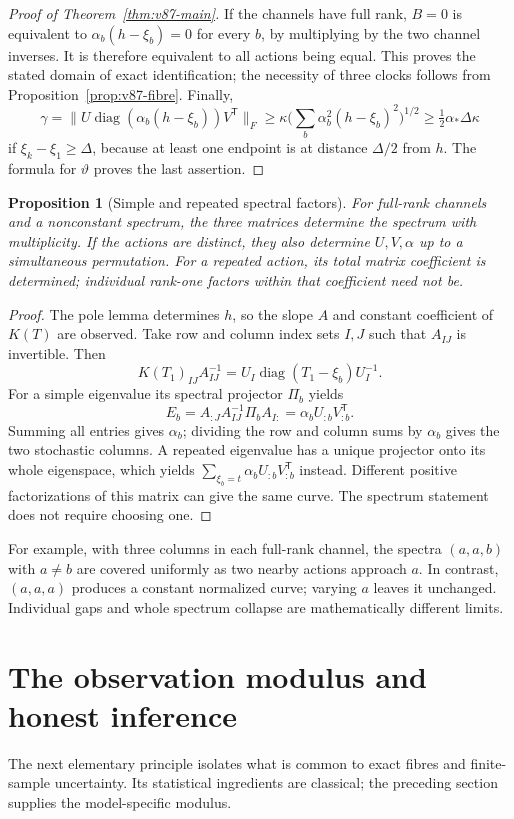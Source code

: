 \documentclass[11pt,reqno]{amsart}
\numberwithin{equation}{section}
\newtheorem{proposition}[theorem]{Proposition}
\theoremstyle{definition}\newtheorem{definition}[theorem]{Definition}
\theoremstyle{remark}\newtheorem{remark}[theorem]{Remark}
\newcommand{\diag}{\operatorname{diag}}
\newcommand{\sig}{\vartheta}
\begin{document}
\begin{proof}[Proof of Theorem~\ref{thm:v87-main}]
If the channels have full rank, $B=0$ is equivalent to
$\alpha_b(h-\xi_b)=0$ for every $b$, by multiplying by the two
channel inverses. It is therefore equivalent to all actions being
equal. This proves the stated domain of exact identification; the
necessity of three clocks follows from Proposition~\ref{prop:v87-fibre}.
Finally,
\[
 \gamma=\|U\diag(\alpha_b(h-\xi_b))V^{\mathsf T}\|_F
 \ge\kappa\Big(\sum_b\alpha_b^2(h-\xi_b)^2\Big)^{1/2}
 \ge\tfrac12\alpha_*\Delta\kappa
\]
if $\xi_k-\xi_1\ge\Delta$, because at least one endpoint is at
distance $\Delta/2$ from $h$. The formula for $\sig$ proves the
last assertion.
\end{proof}

\begin{proposition}[Simple and repeated spectral factors]
\label{prop:v87-factors}
For full-rank channels and a nonconstant spectrum, the three matrices
determine the spectrum with multiplicity. If the actions are distinct,
they also determine $U,V,\alpha$ up to a simultaneous permutation.
For a repeated action, its total matrix coefficient is determined;
individual rank-one factors within that coefficient need not be.
\end{proposition}
\begin{proof}
The pole lemma determines $h$, so the slope $A$ and constant
coefficient of $K(T)$ are observed. Take row and column index sets
$I,J$ such that $A_{IJ}$ is invertible. Then
\[
 K(T_1)_{IJ}A_{IJ}^{-1}
                  =U_I\diag(T_1-\xi_b)U_I^{-1}.
\]
For a simple eigenvalue its spectral projector $\Pi_b$ yields
\[
 E_b=A_{:J}A_{IJ}^{-1}\Pi_b A_{I:}
                          =\alpha_b U_{:b}V_{:b}^{\mathsf T}.
\]
Summing all entries gives $\alpha_b$; dividing the row and column
sums by $\alpha_b$ gives the two stochastic columns. A repeated
eigenvalue has a unique projector onto its whole eigenspace, which
yields $\sum_{\xi_b=t}\alpha_bU_{:b}V_{:b}^{\mathsf T}$ instead.
Different positive factorizations of this matrix can give the same
curve. The spectrum statement does not require choosing one.
\end{proof}
For example, with three columns in each full-rank channel, the spectra
$(a,a,b)$ with $a\ne b$ are covered uniformly as two nearby actions
approach $a$. In contrast, $(a,a,a)$ produces a constant normalized
curve; varying $a$ leaves it unchanged. Individual gaps and whole
spectrum collapse are mathematically different limits.

\section{The observation modulus and honest inference}
\label{sec:v87-statistics}
The next elementary principle isolates what is common to exact fibres
and finite-sample uncertainty. Its statistical ingredients are
classical; the preceding section supplies the model-specific modulus.
\end{document}
